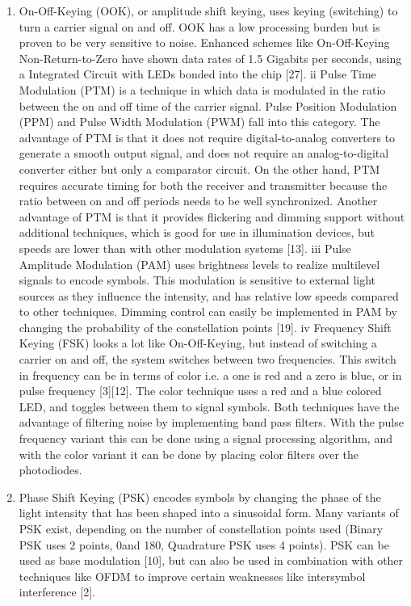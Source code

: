 \begin{enumerate}

\item On-Off-Keying (OOK), or amplitude shift keying, uses keying (switching) to
turn a carrier signal on and off. OOK has a low processing burden but is
proven to be very sensitive to noise. Enhanced schemes like On-Off-Keying
Non-Return-to-Zero have shown data rates of 1.5 Gigabits per seconds,
using a Integrated Circuit with LEDs bonded into the chip [27].
ii Pulse Time Modulation (PTM) is a technique in which data is modulated
in the ratio between the on and off time of the carrier signal. Pulse Position
Modulation (PPM) and Pulse Width Modulation (PWM) fall into this
category. The advantage of PTM is that it does not require digital-to-analog
converters to generate a smooth output signal, and does not require an
analog-to-digital converter either but only a comparator circuit. On the other
hand, PTM requires accurate timing for both the receiver and transmitter
because the ratio between on and off periods needs to be well synchronized.
Another advantage of PTM is that it provides flickering and dimming
support without additional techniques, which is good for use in illumination
devices, but speeds are lower than with other modulation systems [13].
iii Pulse Amplitude Modulation (PAM) uses brightness levels to realize multilevel
signals to encode symbols. This modulation is sensitive to external
light sources as they influence the intensity, and has relative low speeds
compared to other techniques. Dimming control can easily be implemented
in PAM by changing the probability of the constellation points [19].
iv Frequency Shift Keying (FSK) looks a lot like On-Off-Keying, but instead of
switching a carrier on and off, the system switches between two frequencies.
This switch in frequency can be in terms of color i.e. a one is red and
a zero is blue, or in pulse frequency [3][12]. The color technique uses a red
and a blue colored LED, and toggles between them to signal symbols. Both
techniques have the advantage of filtering noise by implementing band pass
filters. With the pulse frequency variant this can be done using a signal processing
algorithm, and with the color variant it can be done by placing color
filters over the photodiodes.

\item Phase Shift Keying (PSK) encodes symbols by changing the phase of the
light intensity that has been shaped into a sinusoidal form. Many variants
of PSK exist, depending on the number of constellation points used (Binary
PSK uses 2 points, 0\degree  and 180\degree , Quadrature PSK uses 4 points). PSK
can be used as base modulation [10], but can also be used in combination
with other techniques like OFDM to improve certain weaknesses like intersymbol
interference [2].


\end{enumerate}
